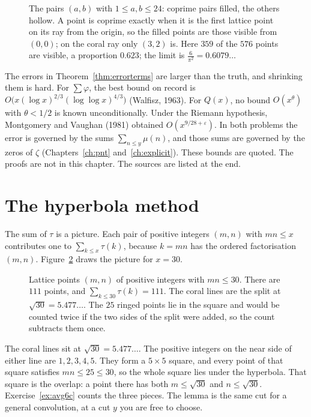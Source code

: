 \begin{figure}[ht]
\centering
{}
\caption{The pairs $(a,b)$ with $1\le a,b\le24$: coprime pairs filled, the others hollow. A point is coprime exactly when it is the first
lattice point on its ray from the origin, so the filled points are those visible from $(0,0)$; on the coral ray only $(3,2)$ is. Here
$359$ of the $576$ points are visible, a proportion $0.623$; the limit is $\frac6{\pi^2}=0.6079\ldots$}
\label{fig:coprime}
\end{figure}

\begin{remark}
The errors in Theorem~\ref{thm:errorterms} are larger than the truth, and shrinking them is hard. For $\sum\varphi$, the best bound on record is $O\bigl(x(\log x)^{2/3}(\log\log x)^{4/3}\bigr)$ (Walfisz, 1963). For $Q(x)$, no bound $O(x^\theta)$ with $\theta<1/2$ is known unconditionally. Under the Riemann hypothesis, Montgomery and Vaughan (1981) obtained $O(x^{9/28+\varepsilon})$. In both problems the error is governed by the sums $\sum_{n\le y}\mu(n)$, and those sums are governed by the zeros of $\zeta$ (Chapters~\ref{ch:pnt} and~\ref{ch:explicit}). These bounds are quoted. The proofs are not in this chapter. The sources are listed at the end.
\end{remark}

\section{The hyperbola method}

The sum of $\tau$ is a picture. Each pair of positive integers $(m,n)$ with $mn\le x$ contributes one to $\sum_{k\le x}\tau(k)$, because $k=mn$ has the ordered factorisation $(m,n)$. Figure~\ref{fig:hyperbola30} draws the picture for $x=30$.

\begin{figure}[ht]
\centering
{}
\caption{Lattice points $(m,n)$ of positive integers with $mn\le30$. There are $111$ points, and $\sum_{k\le30}\tau(k)=111$. The coral lines are the split at $\sqrt{30}=5.477\ldots$. The $25$ ringed points lie in the square and would be counted twice if the two sides of the split were added, so the count subtracts them once.}
\label{fig:hyperbola30}
\end{figure}

The coral lines sit at $\sqrt{30}=5.477\ldots$. The positive integers on the near side of either line are $1,2,3,4,5$. They form a $5\times5$ square, and every point of that square satisfies $mn\le25\le30$, so the whole square lies under the hyperbola. That square is the overlap: a point there has both $m\le\sqrt{30}$ and $n\le\sqrt{30}$. Exercise~\ref{ex:avg6c} counts the three pieces. The lemma is the same cut for a general convolution, at a cut $y$ you are free to choose.

